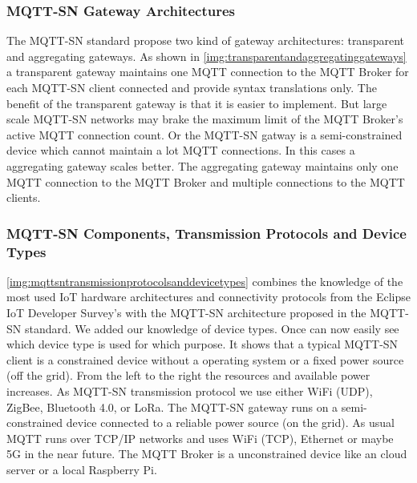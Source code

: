 \subsubsection{MQTT-SN Gateway Architectures}\label{sec:mqttsngatewayarchitectures}
The MQTT-SN standard propose two kind of gateway architectures: transparent and aggregating gateways.
As shown in \autoref{img:transparentandaggregatinggateways} a transparent gateway maintains one MQTT connection to the MQTT Broker for each MQTT-SN client connected and provide syntax translations only.
The benefit of the transparent gateway is that it is easier to implement.
But large scale MQTT-SN networks may brake the maximum limit of the MQTT Broker's active MQTT connection count.
Or the MQTT-SN gatway is a semi-constrained device which cannot maintain a lot MQTT connections.
In this cases a aggregating gateway scales better.
The aggregating gateway maintains only one MQTT connection to the MQTT Broker and multiple connections to the MQTT clients.
\subsubsection{MQTT-SN Components, Transmission Protocols and Device Types}
\autoref{img:mqttsntransmissionprotocolsanddevicetypes} combines the knowledge of the most used IoT hardware architectures and connectivity protocols from the Eclipse IoT Developer Survey's\cite{eclipseiotdevelopersurveyresults} with the MQTT-SN architecture proposed in the MQTT-SN standard\cite{mqttsnstandard}. We added our knowledge of device types.
Once can now easily see which device type is used for which purpose.
It shows that a typical MQTT-SN client is a constrained device without a operating system or a fixed power source (off the grid).
From the left to the right the resources and available power increases.
As MQTT-SN transmission protocol we use either WiFi (UDP), ZigBee, Bluetooth 4.0, or LoRa.
The MQTT-SN gateway runs on a semi-constrained device connected to a reliable power source (on the grid).
As usual MQTT runs over TCP/IP networks and uses WiFi (TCP), Ethernet or maybe 5G in the near future.
The MQTT Broker is a unconstrained device like an cloud server or a local Raspberry Pi.

